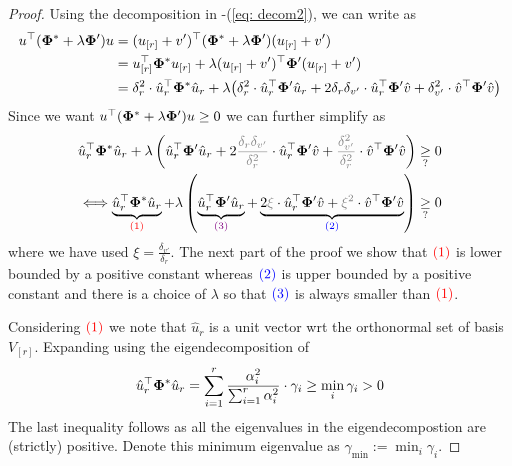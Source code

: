 \begin{proof}
    Using the decomposition in -(\ref{eq: decom2}), we can write  as
    \begin{align}
        u^{\top}(\boldsymbol{\Phi}^* + \lambda \boldsymbol{\Phi}')u &= (u_{[r]} + v')^{\top}(\boldsymbol{\Phi}^* + \lambda \boldsymbol{\Phi}')(u_{[r]} + v') \nonumber\\
        &= u_{[r]}^{\top} \boldsymbol{\Phi}^*u_{[r]} + \lambda (u_{[r]} + v')^{\top}\boldsymbol{\Phi}'(u_{[r]} + v')\nonumber\\
        & = \delta_r^2 \cdot\hat{u}_r^{\top}\boldsymbol{\Phi}^*\hat{u}_r + \lambda\big( \delta_r^2 \cdot\hat{u}_r^{\top}\boldsymbol{\Phi}'\hat{u}_r + 2 \delta_r \delta_{v'}\cdot \hat{u}_r^{\top} \boldsymbol{\Phi}' \hat{v} + \delta^2_{v'}\cdot \hat{v}^{\top}\boldsymbol{\Phi}'\hat{v} \big) \label{eq: eq1}
    \end{align}
    Since we want $u^{\top}(\boldsymbol{\Phi}^* + \lambda \boldsymbol{\Phi}')u \ge 0$ we can further simplify  as 
    \begin{align}
        \hat{u}_r^{\top}\pphi^*\hat{u}_r + \lambda\paren{ \hat{u}_r^{\top}\pphi'\hat{u}_r + 2 \textcolor{gray}{\frac{\delta_r\delta_{v'}}{\delta_r^2 }} \cdot \hat{u}_r^{\top} \pphi' \hat{v} + \textcolor{gray}{\frac{\delta^2_{v'}}{\delta^2_r}}\cdot \hat{v}^{\top}\pphi'\hat{v} } \underset{?}{\ge} 0 \label{eq: equiv1}\\
        \Longleftrightarrow \underbrace{\hat{u}_r^{\top}\pphi^*\hat{u}_r}_{\textcolor{red}{(1)}} + \lambda\paren{ \underbrace{\hat{u}_r^{\top}\pphi'\hat{u}_r}_{\textcolor{violet}{(3)}} + \underbrace{2 \textcolor{gray}{\xi}\cdot \hat{u}_r^{\top} \pphi' \hat{v} + \textcolor{gray}{\xi^2}\cdot \hat{v}^{\top}\pphi'\hat{v} }_{\textcolor{blue}{(2)}}} \underset{?}{\ge} 0 \label{eq: equiv2}
    \end{align}
    where we have used $\xi = \frac{\delta_{v'}}{\delta_r}$. The next part of the proof we show that $\textcolor{red}{(1)}$ is lower bounded by a positive constant whereas $\textcolor{blue}{(2)}$ is upper bounded by a positive constant and there is a choice of $\lambda$ so that $\textcolor{blue}{(3)}$ is always smaller than $\textcolor{red}{(1)}$.
    
    Considering $\textcolor{red}{(1)}$ we note that $\hat{u}_r$ is a unit vector wrt the orthonormal set of basis $V_{[r]}$. Expanding using the eigendecomposition of 
    \begin{align*}
        \hat{u}_r^{\top}\boldsymbol{\Phi}^*\hat{u}_r = \sum_{i=1}^r \frac{\alpha^2_i}{\sum_{i=1}^r \alpha_i^2}\cdot \gamma_i \ge \min_i \gamma_i > 0
    \end{align*}
    The last inequality follows as all the eigenvalues in the eigendecompostion are (strictly) positive. Denote this minimum eigenvalue as $\gamma_{\min} := \min_i \gamma_i$.
    

\end{proof}
